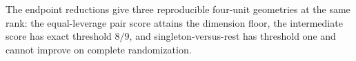 The endpoint reductions give three reproducible four-unit geometries at the same rank: the equal-leverage pair score attains the dimension floor, the intermediate score has exact threshold \(8/9\), and singleton-versus-rest has threshold one and cannot improve on complete randomization.